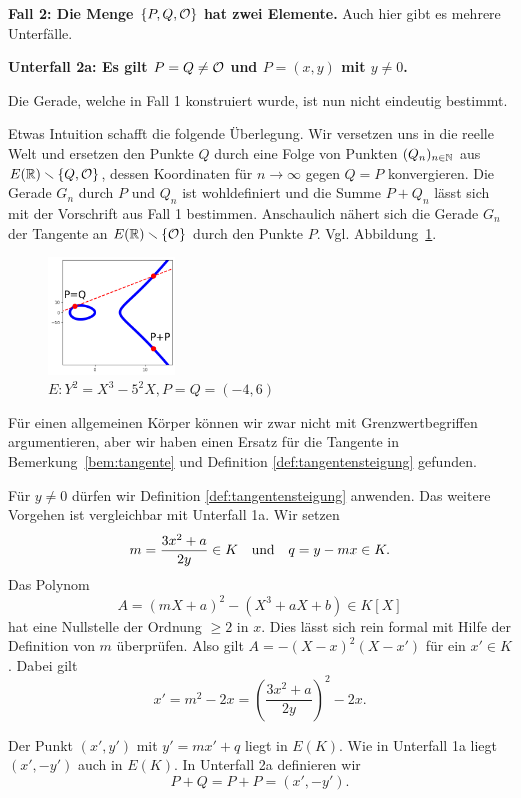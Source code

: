 \medskip
\textbf{Fall 2: Die Menge $\{P,Q,{\mathcal O}\}$ hat zwei Elemente.} Auch hier
gibt es mehrere Unterfälle.

\textbf{Unterfall 2a: Es gilt $P=Q\not={\mathcal O}$ und $P=(x,y)$ mit $y\not=0$.}

Die Gerade, welche in Fall 1 konstruiert wurde, ist nun nicht
eindeutig bestimmt.

Etwas Intuition schafft die folgende Überlegung. Wir
versetzen uns in die reelle Welt und ersetzen den Punkte $Q$ durch
eine Folge von Punkten $(Q_n)_{n\in{\mathbb{N}}}$ aus $E({\mathbb{R}})\smallsetminus\{Q,{\mathcal O}\}$, dessen
Koordinaten für $n\rightarrow\infty$ gegen $Q=P$ konvergieren.
Die Gerade $G_n$ durch $P$ und $Q_n$ ist wohldefiniert und die Summe
$P+Q_n$ lässt sich mit der Vorschrift aus Fall 1 bestimmen.
Anschaulich nähert sich die Gerade $G_n$ der Tangente an
$E({\mathbb{R}})\smallsetminus\{{\mathcal O}\}$ durch den Punkte $P$. Vgl.
Abbildung~\ref{fig:unterfall2a}. 

\begin{figure}
  \centering    
  \caption{$E: Y^2 = X^3-5^2 X,P = Q=(-4,6)$}
  \label{fig:unterfall2a}
  \includegraphics[width=0.3\textwidth]{./plots/unterfall2a.png}
\end{figure}

Für einen allgemeinen Körper können wir zwar nicht mit
Grenzwertbegriffen argumentieren, aber wir haben einen Ersatz für die
Tangente in Bemerkung~\ref{bem:tangente} und Definition
\ref{def:tangentensteigung} gefunden.


Für $y\not=0$ dürfen wir  Definition \ref{def:tangentensteigung}
anwenden. Das weitere Vorgehen ist vergleichbar mit Unterfall 1a.
Wir setzen
$$m =  \frac{3x^2+a}{2y}\in K\quad\text{und}\quad q = y-mx\in K.$$
Das Polynom
$$
A = (mX+a)^2 - (X^3+aX+b) \in K[X]
$$
hat  eine Nullstelle der Ordnung $\ge 2$ in $x$. Dies lässt sich
rein formal mit Hilfe der Definition von $m$ überprüfen.
Also gilt $A = -(X-x)^2(X-x')$ für ein $x'\in K$. Dabei gilt
\begin{equation*}
  x' = m^2 - 2x = \left(\frac{3x^2+a}{2y}\right)^2 - 2x. 
\end{equation*}

Der Punkt $(x',y')$ mit $y'=mx'+q$ liegt in $E(K)$. Wie in Unterfall
1a liegt $(x',-y')$ auch in $E(K)$. 
In Unterfall 2a
definieren wir
\begin{equation*}
  P+Q = P+P = \left(x',-y'\right).
\end{equation*}

